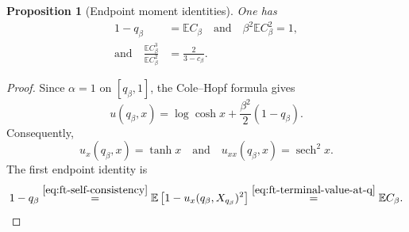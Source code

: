 \documentclass[10pt]{amsart}
\newtheorem{proposition}[proposition]{Proposition}
\theoremstyle{definition}
\theoremstyle{remark}
\numberwithin{equation}{section}
\newcommand{\E}{\mathbb E}
\newcommand{\1}{\mathbf 1}
\newcommand{\sech}{\operatorname{sech}}
\newcommand{\stackref}[2]{\stackrel{#2}{#1}}
\begin{document}
\begin{proposition}[Endpoint moment identities]
\label{prop:ft-endpoint-identities}
One has
\begin{align}
 1-q_\beta&=\E C_\beta\quad\text{and}\quad \beta^2\E C_\beta^2=1,
 \label{eq:ft-endpoint-first-two}\\
 \text{and}\quad \frac{\E C_\beta^3}{\E C_\beta^2}
 &=\frac2{3-c_\beta}.
 \label{eq:ft-endpoint-atom-ratio}
\end{align}
\end{proposition}

\begin{proof}
Since $\alpha=1$ on $[q_\beta,1]$, the Cole--Hopf formula gives
\begin{equation}
 u(q_\beta,x)=\log\cosh x
 +\frac{\beta^2}{2}(1-q_\beta).
 \label{eq:ft-terminal-value-at-q}
\end{equation}
Consequently,
\begin{equation*}
 u_x(q_\beta,x)=\tanh x
 \quad\text{and}\quad
 u_{xx}(q_\beta,x)=\sech^2x.
\end{equation*}
The first endpoint identity is
\begin{equation*}
 1-q_\beta
 \stackref{=}{\eqref{eq:ft-self-consistency}}
 \E\left[1-u_x(q_\beta,X_{q_\beta})^2\right]
 \stackref{=}{\eqref{eq:ft-terminal-value-at-q}}
 \E C_\beta.
\end{equation*}


\end{proof}
\end{document}
